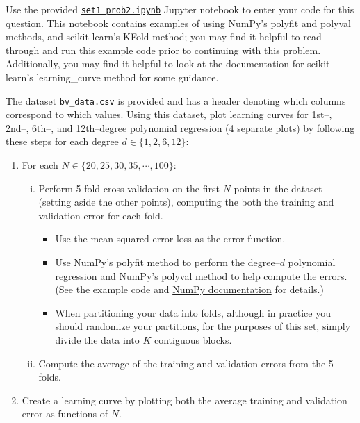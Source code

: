 \begin{problem}[14]
	Use the provided \href{https://github.com/lakigigar/Caltech-CS155-2021/blob/main/psets/set1/set1_prob2.ipynb}{\texttt{set1_prob2.ipynb}} Jupyter notebook to enter your code for this question. This notebook contains examples of using NumPy's polyfit and polyval methods, and scikit-learn's KFold method; you may find it helpful to read through and run this example code prior to continuing with this problem. Additionally, you may find it helpful to look at the documentation for scikit-learn's learning_curve method for some guidance.
	
	The dataset \href{https://github.com/lakigigar/Caltech-CS155-2021/blob/main/psets/set1/data/bv_data.csv}{\texttt{bv_data.csv}} is provided and has a header denoting which columns correspond to which values. Using this dataset, plot learning curves for 1st--, 2nd--, 6th--, and 12th--degree polynomial regression (4 separate plots) by following these steps for each degree $d \in \{1, 2, 6, 12\}$:

  \begin{enumerate}
    \item For each $N \in \{20, 25, 30, 35, \cdots, 100\}$:
    \begin{enumerate}[i.]
      \item Perform 5-fold cross-validation on the first $N$ points in the dataset (setting aside the other points), computing the both the training and validation error for each fold. 
      \begin{itemize}
        \item Use the mean squared error loss as the error function.
        \item Use NumPy's polyfit method to perform the degree--$d$ polynomial regression and NumPy's polyval method to help compute the errors.  (See the example code and \href{https://docs.scipy.org/doc/NumPy/reference/routines.polynomials.poly1d.html}{NumPy documentation} for details.)
        \item When partitioning your data into folds, although in practice you should randomize your partitions, for the purposes of this set, simply divide the data into $K$ contiguous blocks.
      \end{itemize}
      \item Compute the average of the training and validation errors from the 5 folds.
    \end{enumerate}
    \item Create a learning curve by plotting both the average training and validation error as functions of $N$.
  \end{enumerate}

\end{problem}
\begin{solution}
  \end{solution}

